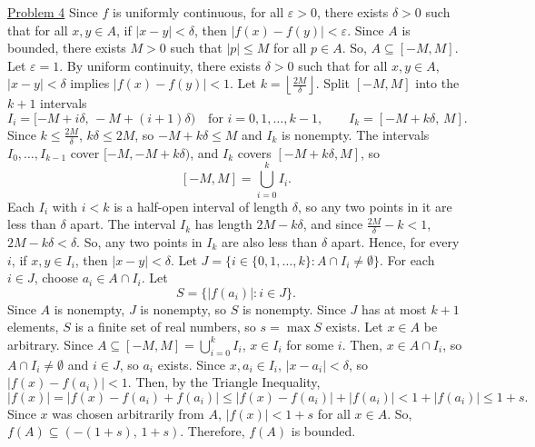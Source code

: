 \documentclass{exam}
\begin{document}
\underline{Problem 4}
\newline
\newline
Since $f$ is uniformly continuous, for all $\varepsilon>0$, there exists $\delta>0$ such that for all $x,y\in A$, if $|x-y|<\delta$, then $|f(x)-f(y)|<\varepsilon$. Since $A$ is bounded, there exists $M>0$ such that $|p|\leq M$ for all $p\in A$. So, $A\subseteq[-M,M]$.
\newline
\newline
Let $\varepsilon=1$. By uniform continuity, there exists $\delta>0$ such that for all $x,y\in A$, $|x-y|<\delta$ implies $|f(x)-f(y)|<1$. Let $k=\left\lfloor\frac{2M}{\delta}\right\rfloor$. Split $[-M,M]$ into the $k+1$ intervals
\[
    I_i=[-M+i\delta,\,-M+(i+1)\delta)\quad\text{for } i=0,1,\ldots,k-1,\qquad I_k=[-M+k\delta,\,M].
\]
Since $k\leq\frac{2M}{\delta}$, $k\delta\leq 2M$, so $-M+k\delta\leq M$ and $I_k$ is nonempty. The intervals $I_0,\ldots,I_{k-1}$ cover $[-M,-M+k\delta)$, and $I_k$ covers $[-M+k\delta,M]$, so
\[
    [-M,M]=\bigcup_{i=0}^{k}I_i.
\]
Each $I_i$ with $i<k$ is a half-open interval of length $\delta$, so any two points in it are less than $\delta$ apart. The interval $I_k$ has length $2M-k\delta$, and since $\frac{2M}{\delta}-k<1$, $2M-k\delta<\delta$. So, any two points in $I_k$ are also less than $\delta$ apart. Hence, for every $i$, if $x,y\in I_i$, then $|x-y|<\delta$.
\newline
\newline
Let $J=\{i\in\{0,1,\ldots,k\} : A\cap I_i\neq\emptyset\}$. For each $i\in J$, choose $a_i\in A\cap I_i$. Let
\[
    S=\{|f(a_i)| : i\in J\}.
\]
Since $A$ is nonempty, $J$ is nonempty, so $S$ is nonempty. Since $J$ has at most $k+1$ elements, $S$ is a finite set of real numbers, so $s=\max S$ exists.
\newline
\newline
Let $x\in A$ be arbitrary. Since $A\subseteq[-M,M]=\bigcup_{i=0}^{k}I_i$, $x\in I_i$ for some $i$. Then, $x\in A\cap I_i$, so $A\cap I_i\neq\emptyset$ and $i\in J$, so $a_i$ exists. Since $x,a_i\in I_i$, $|x-a_i|<\delta$, so $|f(x)-f(a_i)|<1$. Then, by the Triangle Inequality,
\[
    |f(x)|=|f(x)-f(a_i)+f(a_i)|\leq|f(x)-f(a_i)|+|f(a_i)|<1+|f(a_i)|\leq 1+s.
\]
Since $x$ was chosen arbitrarily from $A$, $|f(x)|<1+s$ for all $x\in A$. So, $f(A)\subseteq(-(1+s),\,1+s)$. Therefore, $f(A)$ is bounded.
\end{document}
